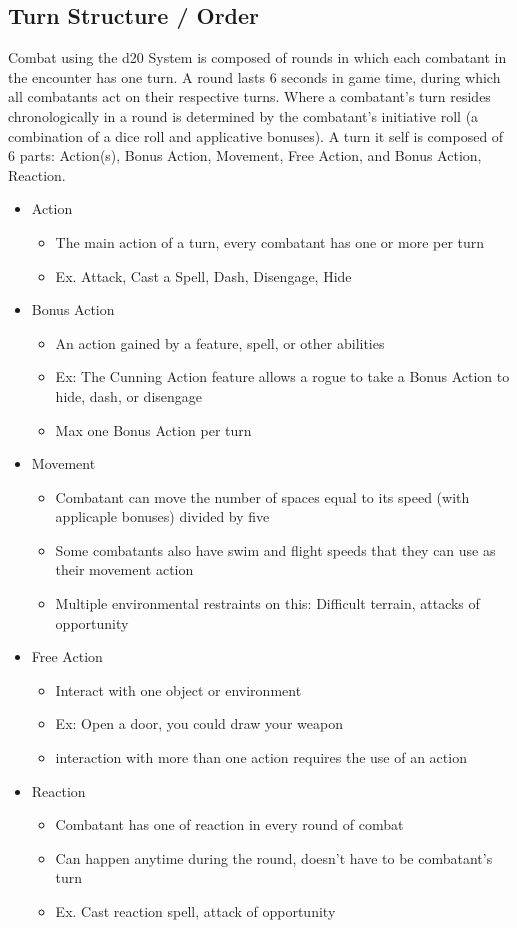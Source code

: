 \documentclass[12pt,a4paper]{report}
\begin{document}
	\subsection{Turn Structure / Order}
	Combat using the d20 System is composed of rounds in which each combatant in the encounter has one turn.  A round lasts 6 seconds in game time, during which all combatants act on their respective turns. Where a combatant's turn resides chronologically in a round is determined by the combatant's initiative roll (a combination of a dice roll and applicative bonuses). A turn it self is composed of 6 parts: Action(s), Bonus Action, Movement, Free Action, and Bonus Action, Reaction.
	\begin{itemize}
		\item Action
		\begin{itemize}
			\item The main action of a turn, every combatant has one or more per turn
			\item Ex. Attack, Cast a Spell, Dash, Disengage, Hide
		\end{itemize}
		\item Bonus Action
		\begin{itemize}
			\item An action gained by a feature, spell, or other abilities
			\item Ex: The Cunning Action feature allows a rogue to take a Bonus Action to hide, dash, or disengage
			\item Max one Bonus Action per turn
		\end{itemize}
		\item Movement
		\begin{itemize}
			\item Combatant can move the number of spaces equal to its speed (with applicaple bonuses) divided by five
			\item Some combatants also have swim and flight speeds that they can use as their movement action
			\item Multiple environmental restraints on this: Difficult terrain, attacks of opportunity
		\end{itemize}
		\item Free Action
		\begin{itemize}
			\item Interact with one object or environment 
			\item Ex: Open a door, you could draw your weapon
			\item interaction with more than one action requires the use of an action
		\end{itemize}
		\item Reaction
		\begin{itemize}
			\item Combatant has one of reaction in every round of combat
			\item Can happen anytime during the round, doesn't have to be combatant's turn
			\item Ex. Cast reaction spell, attack of opportunity
		\end{itemize}
	\end{itemize}
	
\end{document}
